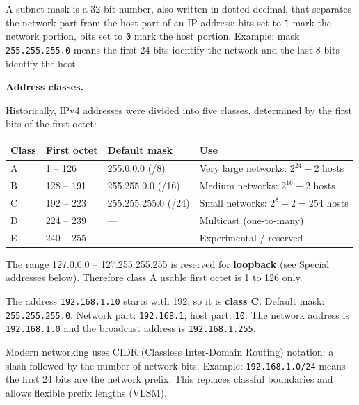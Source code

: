 \documentclass[11pt]{article}
\newcommand{\cle}[1]{{\popxbold\color{popdark}#1}}
\newcounter{popsec}
\newcounter{popsub}
\newcommand{\courssub}[1]{%
  \stepcounter{popsub}%
  \par\vspace{9pt}\noindent{\popxbold\fontsize{11.5}{13}\selectfont\color{popink}{\color{poporange}\thepopsec.\thepopsub}\hspace{6pt}#1}\par\nopagebreak\vspace{4pt}
}
\begin{document}
\begin{definition}
A \cle{subnet mask} is a 32-bit number, also written in dotted decimal, that separates the network part from the host part of an IP address: bits set to \texttt{1} mark the network portion, bits set to \texttt{0} mark the host portion. Example: mask \texttt{255.255.255.0} means the first 24 bits identify the network and the last 8 bits identify the host.
\end{definition}

\textbf{Address classes.}\par
Historically, IPv4 addresses were divided into five classes, determined by the first bits of the first octet:

\begin{center}
\begin{tabularx}{\linewidth}{|l|l|l|X|}
\hline
\rowcolor{popblueL} \textbf{Class} & \textbf{First octet} & \textbf{Default mask} & \textbf{Use} \\
\hline
A & 1 -- 126 & 255.0.0.0 (/8) & Very large networks: $2^{24}-2$ hosts \\
\hline
B & 128 -- 191 & 255.255.0.0 (/16) & Medium networks: $2^{16}-2$ hosts \\
\hline
C & 192 -- 223 & 255.255.255.0 (/24) & Small networks: $2^{8}-2 = 254$ hosts \\
\hline
D & 224 -- 239 & --- & Multicast (one-to-many) \\
\hline
E & 240 -- 255 & --- & Experimental / reserved \\
\hline
\end{tabularx}
\end{center}

\begin{attention}
The range 127.0.0.0 -- 127.255.255.255 is reserved for \textbf{loopback} (see Special addresses below). Therefore class A usable first octet is 1 to 126 only.
\end{attention}

\begin{exemplebox}
The address \texttt{192.168.1.10} starts with 192, so it is \textbf{class C}. Default mask: \texttt{255.255.255.0}. Network part: \texttt{192.168.1}; host part: \texttt{10}. The network address is \texttt{192.168.1.0} and the broadcast address is \texttt{192.168.1.255}.
\end{exemplebox}

\courssub{CIDR Notation}

Modern networking uses \cle{CIDR} (Classless Inter-Domain Routing) notation: a slash followed by the number of network bits. Example: \texttt{192.168.1.0/24} means the first 24 bits are the network prefix. This replaces classful boundaries and allows flexible prefix lengths (VLSM).
\end{document}
